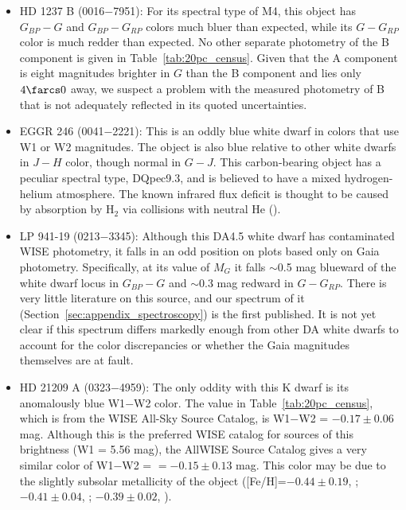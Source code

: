 \documentclass[twocolumn,tighten,twocolappendix]{aastex631}
\begin{document}
\begin{itemize}

\item HD 1237 B (0016$-$7951): For its spectral type of M4, this object has $G_{BP} - G$ and $G_{BP} - G_{RP}$ colors much bluer than expected, while its $G - G_{RP}$ color is much redder than expected. No other separate photometry of the B component is given in Table~\ref{tab:20pc_census}. Given that the A component is eight magnitudes brighter in $G$ than the B component and lies only $4{\farcs}0$ away, we suspect a problem with the measured photometry of B that is not adequately reflected in its quoted uncertainties.

\item EGGR 246 (0041$-$2221): This is an oddly blue white dwarf in colors that use W1 or W2 magnitudes. The object is also blue relative to other white dwarfs in $J-H$ color, though normal in $G-J$. This carbon-bearing object has a peculiar spectral type, DQpec9.3, and is believed to have a mixed hydrogen-helium atmosphere. The known infrared flux deficit is thought to be caused by absorption by H$_2$ via collisions with neutral He  (\citealt{giammichele2012,bergeron1994,bergeron2022}).

\item LP 941-19 (0213$-$3345): Although this DA4.5 white dwarf has contaminated WISE photometry, it falls in an odd position on plots based only on Gaia photometry. Specifically, at its value of $M_G$ it falls $\sim$0.5 mag blueward of the white dwarf locus in $G_{BP}-G$ and $\sim$0.3 mag redward in $G-G_{RP}$. There is very little literature on this source, and our spectrum of it (Section~\ref{sec:appendix_spectroscopy}) is the first published. It is not yet clear if this spectrum differs markedly enough from other DA white dwarfs to account for the color discrepancies or whether the Gaia magnitudes themselves are at fault. 

\item HD 21209 A (0323$-$4959): The only oddity with this K dwarf is its anomalously blue W1$-$W2 color. The value in Table~\ref{tab:20pc_census}, which is from the WISE All-Sky Source Catalog, is W1$-$W2 = $-0.17{\pm}0.06$ mag. Although this is the preferred WISE catalog for sources of this brightness (W1 = 5.56 mag), the AllWISE Source Catalog gives a very similar color of W1$-$W2 = $=-0.15{\pm}0.13$ mag. This color may be due to the slightly subsolar metallicity of the object ([Fe/H]=$-0.44{\pm}0.19$, \citealt{soto2018}; $-0.41{\pm}0.04$, \citealt{sousa2008}; $-0.39{\pm}0.02$, \citealt{tsantaki2013}).


\end{itemize}
\end{document}
